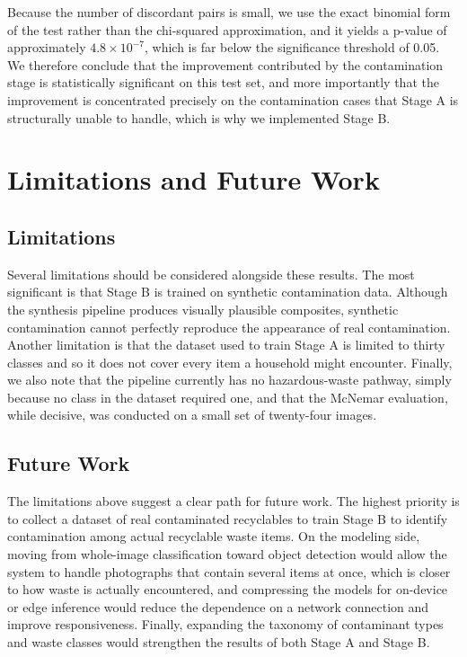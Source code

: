 \documentclass[10pt,twocolumn]{article}
\begin{document}
Because the number of discordant pairs is small, we use the exact binomial form of the test rather than the chi-squared approximation, and it yields a p-value of approximately $4.8\times10^{-7}$, which is far below the significance threshold of 0.05. We therefore conclude that the improvement contributed by the contamination stage is statistically significant on this test set, and more importantly that the improvement is concentrated precisely on the contamination cases that Stage A is structurally unable to handle, which is why we implemented Stage B.

\section{Limitations and Future Work}
\subsection{Limitations}
Several limitations should be considered alongside these results. The most significant is that Stage B is trained on synthetic contamination data. Although the synthesis pipeline produces visually plausible composites, synthetic contamination cannot perfectly reproduce the appearance of real contamination. Another limitation is that the dataset used to train Stage A is limited to thirty classes and so it does not cover every item a household might encounter. Finally, we also note that the pipeline currently has no hazardous-waste pathway, simply because no class in the dataset required one, and that the McNemar evaluation, while decisive, was conducted on a small set of twenty-four images.

\subsection{Future Work}
The limitations above suggest a clear path for future work. The highest priority is to collect a dataset of real contaminated recyclables to train Stage B to identify contamination among actual recyclable waste items. On the modeling side, moving from whole-image classification toward object detection would allow the system to handle photographs that contain several items at once, which is closer to how waste is actually encountered, and compressing the models for on-device or edge inference would reduce the dependence on a network connection and improve responsiveness. Finally, expanding the taxonomy of contaminant types and waste classes would strengthen the results of both Stage A and Stage B.
\end{document}
